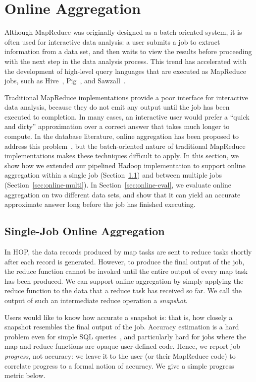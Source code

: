 \section{Online Aggregation}
\label{sec:online}

Although MapReduce was originally designed as a batch-oriented system,
it is often used for interactive data analysis: a user submits a job
to extract information from a data set, and then waits to view the
results before proceeding with the next step in the data analysis
process. This trend has accelerated with the development of high-level
query languages that are executed as MapReduce jobs, such as
Hive~\cite{hive}, Pig~\cite{pig}, and Sawzall~\cite{sawzall}.

Traditional MapReduce implementations provide a poor interface for interactive
data analysis, because they do not emit any output until the job has been
executed to completion. In many cases, an interactive user would prefer a
``quick and dirty'' approximation over a correct answer that takes much longer
to compute. In the database literature, online aggregation has been proposed to
address this problem~\cite{onlineagg}, but the batch-oriented nature of
traditional MapReduce implementations makes these techniques difficult to
apply. In this section, we show how we extended our pipelined Hadoop
implementation to support online aggregation within a single job
(Section~\ref{sec:online-single}) and between multiple jobs
(Section~\ref{sec:online-multi}). In Section~\ref{sec:online-eval}, we evaluate
online aggregation on two different data sets, and show that it can yield an
accurate approximate answer long before the job has finished executing.

\subsection{Single-Job Online Aggregation}
\label{sec:online-single}

In HOP, the data records produced by map tasks are sent to reduce tasks shortly
after each record is generated. However, to produce the final output of the job,
the reduce function cannot be invoked until the entire output of every map task
has been produced. We can support online aggregation by simply applying the
reduce function to the data that a reduce task has received so far. We call the
output of such an intermediate reduce operation a \emph{snapshot}.

Users would like to know how accurate a snapshot is: that is, how
closely a snapshot resembles the final output of the job. Accuracy
estimation is a hard problem even for simple SQL queries~\cite{dbo}, 
and particularly hard for jobs where the map and reduce
functions are opaque user-defined code. Hence, we report job \emph{progress}, not
accuracy: we leave it to the user (or their MapReduce code) to correlate
progress to a formal notion of accuracy.  We give a simple progress metric below.

